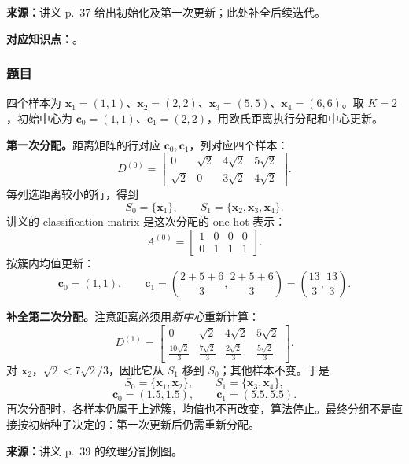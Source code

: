 \nopagebreak[4]

\textbf{来源：}讲义 p.~37 给出初始化及第一次更新；此处补全后续迭代。

\textbf{对应知识点：}。

\subsubsection*{题目}

四个样本为 $\bm x_1=(1,1)$、$\bm x_2=(2,2)$、$\bm x_3=(5,5)$、$\bm x_4=(6,6)$。取 $K=2$，初始中心为 $\bm c_0=(1,1)$、$\bm c_1=(2,2)$，用欧氏距离执行分配和中心更新。

\begin{checkedsolution}
\textbf{第一次分配。}距离矩阵的行对应 $\bm c_0,\bm c_1$，列对应四个样本：
\[
  D^{(0)}=\begin{bmatrix}
    0&\sqrt2&4\sqrt2&5\sqrt2\\
    \sqrt2&0&3\sqrt2&4\sqrt2
  \end{bmatrix}.
\]
每列选距离较小的行，得到
\[
  S_0=\{\bm x_1\},\qquad S_1=\{\bm x_2,\bm x_3,\bm x_4\}.
\]
讲义的 classification matrix 是这次分配的 one-hot 表示：
\[
  A^{(0)}=\begin{bmatrix}1&0&0&0\\0&1&1&1\end{bmatrix}.
\]
按簇内均值更新：
\[
  \bm c_0=(1,1),\qquad
  \bm c_1=\left(\frac{2+5+6}{3},\frac{2+5+6}{3}\right)
  =\left(\frac{13}{3},\frac{13}{3}\right).
\]

\textbf{补全第二次分配。}注意距离必须用\emph{新中心}重新计算：
\[
  D^{(1)}=\begin{bmatrix}
    0&\sqrt2&4\sqrt2&5\sqrt2\\
    \frac{10\sqrt2}{3}&\frac{7\sqrt2}{3}&\frac{2\sqrt2}{3}&\frac{5\sqrt2}{3}
  \end{bmatrix}.
\]
对 $\bm x_2$，$\sqrt2<7\sqrt2/3$，因此它从 $S_1$ 移到 $S_0$；其他样本不变。于是
\[
  S_0=\{\bm x_1,\bm x_2\},\qquad S_1=\{\bm x_3,\bm x_4\},
\]
\[
  \boxed{\bm c_0=(1.5,1.5),\qquad\bm c_1=(5.5,5.5)}.
\]
再次分配时，各样本仍属于上述簇，均值也不再改变，算法停止。最终分组不是直接按初始种子决定的：第一次更新后仍需重新分配。
\end{checkedsolution}

\nopagebreak[4]

\textbf{来源：}讲义 p.~39 的纹理分割例图。

